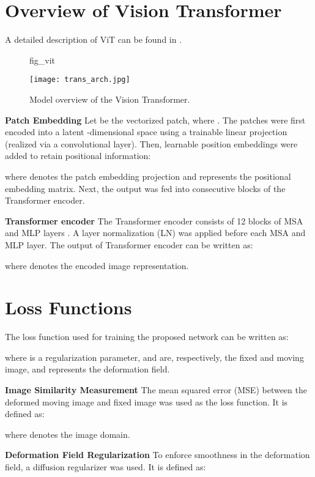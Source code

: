 \documentclass{midl}
\begin{document}



\newpage
\appendix
\section{Overview of Vision Transformer}
A detailed description of ViT can be found in \cite{dosovitskiy2020image, vaswani2017attention, chen2021transunet}.
\label{ViT_overview}
\begin{figure}[!h]
\floatconts
{fig_vit}
  {\caption{Model overview of the Vision Transformer.}}
  {\texttt{[image: trans\_arch.jpg]}}
\end{figure}

\noindent\textbf{Patch Embedding}
Let  be the  vectorized patch, where . The patches were first encoded into a latent -dimensional space using a trainable linear projection (realized via a convolutional layer). Then, learnable position embeddings were added to retain positional information:

where  denotes the patch embedding projection and  represents the positional embedding matrix. Next, the output  was fed into consecutive blocks of the Transformer encoder.

\noindent\textbf{Transformer encoder} The Transformer encoder consists of 12 blocks of MSA and MLP layers \cite{vaswani2017attention}. A layer normalization (LN) was applied before each MSA and MLP layer. The output of  Transformer encoder can be written as:

where  denotes the encoded image representation.

\section{Loss Functions}
\label{Loss}
The loss function used for training the proposed network can be written as:

where  is a regularization parameter,  and  are, respectively, the fixed and moving image, and  represents the deformation field.

\noindent\textbf{Image Similarity Measurement}
The mean squared error (MSE) between the deformed moving image and fixed image was used as the loss function. It is defined as:

where  denotes the image domain.

\noindent\textbf{Deformation Field Regularization}
To enforce smoothness in the deformation field, a diffusion regularizer was used. It is defined as:
\end{document}
